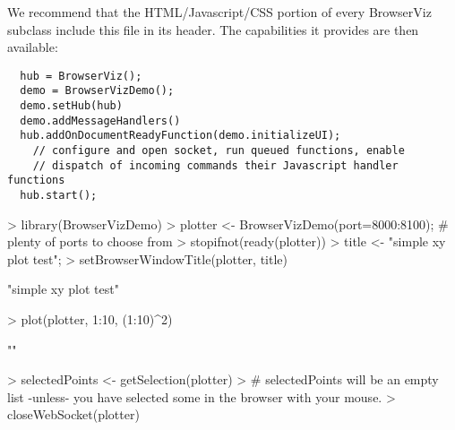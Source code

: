 \documentclass{article}
\begin{document}
We recommend that the HTML/Javascript/CSS portion of every BrowserViz subclass include this file in its
header.  The capabilities it provides are then available:

\begin{verbatim}
  hub = BrowserViz();   
  demo = BrowserVizDemo();
  demo.setHub(hub)
  demo.addMessageHandlers()
  hub.addOnDocumentReadyFunction(demo.initializeUI);
    // configure and open socket, run queued functions, enable
    // dispatch of incoming commands their Javascript handler functions
  hub.start();
\end{verbatim}


\begin{Schunk}
\begin{Sinput}
> library(BrowserVizDemo)
> plotter <- BrowserVizDemo(port=8000:8100);  # plenty of ports to choose from
> stopifnot(ready(plotter))
> title <- "simple xy plot test";
> setBrowserWindowTitle(plotter, title)
\end{Sinput}
\begin{Soutput}
[1] "simple xy plot test"
\end{Soutput}
\begin{Sinput}
> plot(plotter, 1:10, (1:10)^2)
\end{Sinput}
\begin{Soutput}
[1] ""
\end{Soutput}
\begin{Sinput}
> selectedPoints <- getSelection(plotter)
>   # selectedPoints will be an empty list -unless- you have selected some in the browser with your mouse.
> closeWebSocket(plotter)
\end{Sinput}
\end{Schunk}
\end{document}
